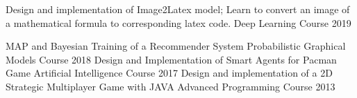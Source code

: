 
\begin{cvhonors}
        \cvhonor
        {Design and implementation of Image2Latex model; Learn to convert an image of a mathematical formula to corresponding latex code.}
        {Deep Learning Course}
        {}{2019}
    
	\cvhonor
	{MAP and Bayesian Training of a Recommender System}
	{Probabilistic Graphical Models Course}
	{}{2018}
	\cvhonor
	{Design and Implementation of Smart Agents for Pacman Game}
	{Artificial Intelligence Course}
	{}{2017}
	\cvhonor
	{Design and implementation of a 2D Strategic Multiplayer Game with JAVA}
	{Advanced Programming Course}
	{}{2013}
\end{cvhonors}

